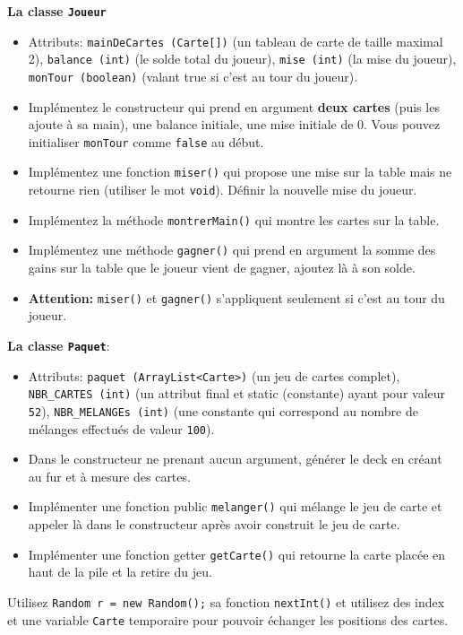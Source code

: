 \begin{Exercice}[15 minutes]
    
    \textbf{La classe \lstinline{Joueur}}
    \begin{itemize}
        \item Attributs: \lstinline{mainDeCartes (Carte[])} (un tableau de carte de taille maximal 2), \lstinline{balance (int)} (le solde total du joueur), \lstinline{mise (int)} (la mise du joueur), \lstinline{monTour (boolean)} (valant true si c’est au tour du joueur).
        \item Implémentez le constructeur qui prend en argument \textbf{deux cartes} (puis les ajoute à sa main), une balance initiale, une mise initiale de 0. Vous pouvez initialiser \lstinline{monTour} comme \lstinline{false} au début.
        \item Implémentez une fonction \lstinline{miser()} qui propose une mise sur la table mais ne retourne rien (utiliser le mot \lstinline{void}). Définir la nouvelle mise du joueur.
        \item Implémentez la méthode \lstinline{montrerMain()} qui montre les cartes sur la table.
        \item Implémentez une méthode \lstinline{gagner()} qui prend en argument la somme des gains sur la table que le joueur vient de gagner, ajoutez là à son solde.
        \item \textbf{Attention:} \lstinline{miser()} et \lstinline{gagner()} s'appliquent seulement si c’est au tour du joueur.
    \end{itemize}
    
    
    \textbf{La classe \lstinline{Paquet}}:
    \begin{itemize}
        \item Attributs: \lstinline{paquet (ArrayList<Carte>)} (un jeu de cartes complet), \lstinline{NBR_CARTES (int)} (un attribut final et static (constante) ayant pour valeur \lstinline{52}), \lstinline{NBR_MELANGEs (int)} (une constante qui correspond au nombre de mélanges effectués de valeur \lstinline{100}).
        \item Dans le constructeur ne prenant aucun argument, générer le deck en créant au fur et à mesure des cartes. 
        \item Implémenter une fonction public \lstinline{melanger()} qui mélange le jeu de carte et appeler là dans le constructeur après avoir construit le jeu de carte.
        \item Implémenter une fonction getter \lstinline{getCarte()} qui retourne la carte placée en haut de la pile et la retire du jeu.
    \end{itemize}
    \begin{conseil}
    Utilisez \lstinline{Random r = new Random();} sa fonction \lstinline{nextInt()} et utilisez des index et une variable \lstinline{Carte} temporaire pour pouvoir échanger les positions des cartes.
    \end{conseil}
    

\end{Exercice}

